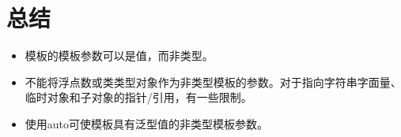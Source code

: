 \section{总结}

\begin{itemize}
\item 
模板的模板参数可以是值，而非类型。

\item 
不能将浮点数或类类型对象作为非类型模板的参数。对于指向字符串字面量、临时对象和子对象的指针/引用，有一些限制。

\item 
使用auto可使模板具有泛型值的非类型模板参数。
\end{itemize}